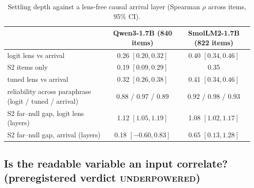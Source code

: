 \documentclass[11pt]{article}
\newcommand{\verdict}[1]{\textsc{\MakeLowercase{#1}}}
\begin{document}
\begin{table}[t]
\centering\small
\caption{Settling depth against a lens-free causal arrival layer (Spearman $\rho$ across items, 95\% CI).}
\label{tab:lens}
\begin{tabular}{@{}lcc@{}}
\toprule
 & Qwen3-1.7B (840 items) & SmolLM2-1.7B (822 items) \\
\midrule
logit lens vs arrival & 0.26 $[0.20, 0.32]$ & 0.40 $[0.34, 0.46]$ \\
\quad S2 items only & 0.19 $[0.09, 0.29]$ & 0.35 \\
tuned lens vs arrival & 0.32 $[0.26, 0.38]$ & 0.41 $[0.34, 0.46]$ \\
reliability across paraphrase (logit / tuned / arrival) & 0.88 / 0.97 / 0.89 & 0.92 / 0.98 / 0.93 \\
S2 far--null gap, logit lens (layers) & 1.12 $[1.05, 1.19]$ & 1.08 $[1.02, 1.17]$ \\
S2 far--null gap, arrival (layers) & 0.18 $[-0.60, 0.83]$ & 0.65 $[0.13, 1.28]$ \\
\bottomrule
\end{tabular}
\end{table}

\subsection{Is the readable variable an input correlate? (preregistered verdict \verdict{UNDERPOWERED})}
\end{document}
